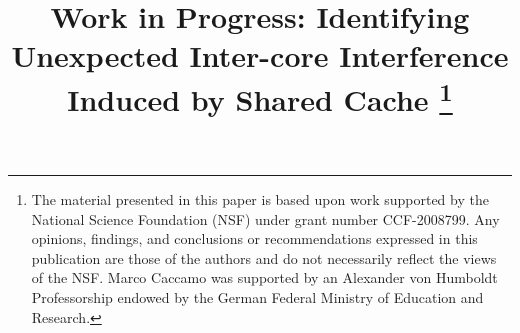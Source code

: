 \documentclass[10pt,conference]{IEEEtran}
\begin{document}
\newcommand\schim{SchIM\xspace}
\newcommand\schimL{Scheduler In-the-Middle\xspace}
\newcommand\schiml{scheduler in-the-middle\xspace}
\newcommand\axiin[1]{$\texttt{HPM}_{#1}$\xspace}
\newcommand\axiout[1]{$\texttt{HPS}_{#1}$\xspace}
\newcommand\axiconf[1]{$\texttt{LPM}_{#1}$\xspace}

\newcommand{\fig}[1]{Fig.~\ref{#1}}

\newcommand*\circledfig[2]{Fig.~\ref{#1}\tikz[baseline=0pt]{\node[anchor=south west,red,shape=circle,draw,inner sep=1pt] (char) {\scriptsize#2};}}

\newcommand*\circled[1]{\tikz[baseline=0pt]{\node[anchor=south west,red,shape=circle,draw,inner sep=1pt] (char) {\scriptsize#1};}}

\title{
    Work in Progress: Identifying Unexpected Inter-core Interference Induced by Shared Cache
    \thanks{
        The material presented in this paper is based upon work supported by the National Science Foundation (NSF) under grant number CCF-2008799. Any opinions, findings, and conclusions or recommendations expressed in this publication are those of the authors and do not necessarily reflect the views of the NSF.
        Marco Caccamo was supported by an Alexander von Humboldt Professorship endowed by the German Federal Ministry of Education and Research.
    }
}
\end{document}
